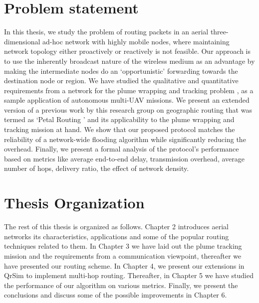 \section{Problem statement}

In this thesis, we study the problem of routing packets in an aerial three-dimensional ad-hoc network with highly mobile nodes, where maintaining network topology either proactively or reactively is not feasible. Our approach is to use the inherently broadcast nature of the wireless medium as an advantage by making the intermediate nodes do an `opportunistic' forwarding towards the destination node or region. We have studied the qualitative and quantitative requirements from a network for the plume wrapping and tracking problem \cite{8080382}, as a sample application of autonomous multi-UAV missions. We present an extended version of a previous work by this research group on geographic routing that was termed as `Petal Routing \cite{6133499}' and its applicability to the plume wrapping and tracking mission at hand. We show that our proposed protocol matches the reliability of a network-wide flooding algorithm while significantly reducing the overhead. Finally, we present a formal analysis of the protocol's performance based on metrics like average end-to-end delay, transmission overhead, average number of hops, delivery ratio, the effect of network density.


\section{Thesis Organization} 

The rest of this thesis is organized as follows. Chapter 2 introduces aerial networks its characteristics, applications and some of the popular routing techniques related to them. In Chapter 3 we have laid out the plume tracking mission and the requirements from a communication viewpoint, thereafter we have presented our routing scheme. In Chapter 4, we present our extensions in QrSim to implement multi-hop routing. Thereafter, in Chapter 5 we have studied the performance of our algorithm on various metrics. Finally, we present the conclusions and discuss some of the possible improvements in Chapter 6.